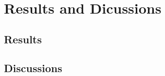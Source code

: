 \hypertarget{methodology}{%
\chapter{Results and Dicussions}\label{methodology}}


\hypertarget{results}{%
\section{Results}\label{results}}


\hypertarget{discussions}{%
\section{Discussions}\label{discussions}}

